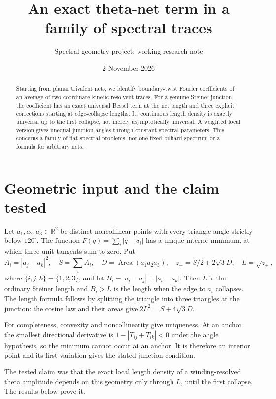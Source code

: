 \documentclass[11pt]{article}
\title{An exact theta-net term in a family of spectral traces}
\author{Spectral geometry project: working research note}
\date{2 November 2026}
\begin{document}
\maketitle
\begin{abstract}
Starting from planar trivalent nets, we identify boundary-twist Fourier
coefficients of an average of two-coordinate kinetic resolvent traces.
For a genuine Steiner junction, the coefficient has an exact universal
Bessel term at the net length and three explicit corrections starting
at edge-collapse lengths. Its continuous length density is exactly
universal up to the first collapse, not merely asymptotically universal.
A weighted local version gives unequal junction angles through constant
spectral parameters. This concerns a family of flat spectral problems,
not one fixed billiard spectrum or a formula for arbitrary nets.
\end{abstract}

\section{Geometric input and the claim tested}
Let \(a_1,a_2,a_3\in\mathbb R^2\) be distinct noncollinear points with
every triangle angle strictly below \(120^\circ\). The function
\(F(q)=\sum_i|q-a_i|\) has a unique interior minimum, at which three
unit tangents sum to zero. Put
\[
 A_i=|a_j-a_k|^2,\quad S=\sum_iA_i,\quad D=\operatorname{Area}(a_1a_2a_3),
 \quad z_\pm=S/2\pm2\sqrt3D,\quad L=\sqrt{z_+},
\]
where \(\{i,j,k\}=\{1,2,3\}\), and let
\(B_i=|a_i-a_j|+|a_i-a_k|\).
Then \(L\) is the ordinary Steiner length and \(B_i>L\) is the length
when the edge to \(a_i\) collapses. The length formula follows by
splitting the triangle into three triangles at the junction:
the cosine law and their areas give \(2L^2=S+4\sqrt3D\).

For completeness, convexity and noncollinearity give uniqueness.
At an anchor the smallest directional derivative is
\(1-|T_{ij}+T_{ik}|<0\) under the angle hypothesis, so the minimum
cannot occur at an anchor. It is therefore an interior point and
its first variation gives the stated junction condition.

The tested claim was that the exact local length density of a
winding-resolved theta amplitude depends on this geometry only through
\(L\), until the first collapse. The results below prove it.
\end{document}
